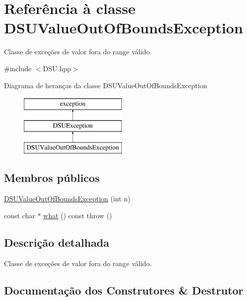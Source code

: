 \hypertarget{classDSUValueOutOfBoundsException}{}\section{Referência à classe D\+S\+U\+Value\+Out\+Of\+Bounds\+Exception}
\label{classDSUValueOutOfBoundsException}


Classe de exceções de valor fora do range válido.  




{\ttfamily \#include $<$D\+S\+U.\+hpp$>$}

Diagrama de heranças da classe D\+S\+U\+Value\+Out\+Of\+Bounds\+Exception\begin{figure}[H]
\begin{center}
\leavevmode
\includegraphics[height=3.000000cm]{classDSUValueOutOfBoundsException}
\end{center}
\end{figure}
\subsection*{Membros públicos}
\begin{DoxyCompactItemize}
\item 
\hyperlink{classDSUValueOutOfBoundsException_ace15ec35fac30116b21fe713f59f2943}{D\+S\+U\+Value\+Out\+Of\+Bounds\+Exception} (int n)
\item 
const char $\ast$ \hyperlink{classDSUValueOutOfBoundsException_a20697d2be588c4f19046c9f468675bde}{what} () const  throw ()
\end{DoxyCompactItemize}


\subsection{Descrição detalhada}
Classe de exceções de valor fora do range válido. 

\subsection{Documentação dos Construtores \& Destrutor}
\mbox{\label{classDSUValueOutOfBoundsException_ace15ec35fac30116b21fe713f59f2943}} 
